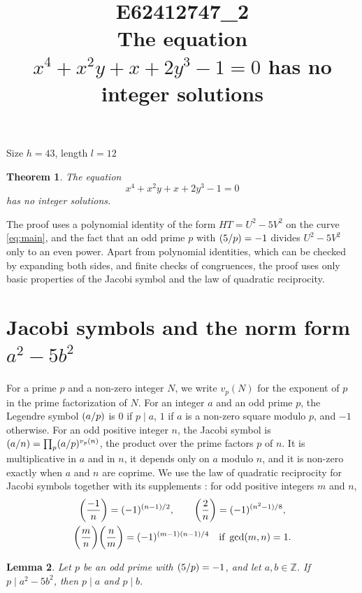 \documentclass[11pt]{article}
\title{\textbf{E62412747\_2}\\[4pt] {\Large The equation $x^{4}+x^{2}y+x+2y^{3}-1=0$ has no integer solutions}}
\author{}
\date{}
\newtheorem{theorem}{Theorem}
\newtheorem{lemma}[theorem]{Lemma}
\newcommand{\Z}{\mathbb{Z}}
\newcommand{\leg}[2]{\mathchoice{\biggl(\dfrac{#1}{#2}\biggr)}{(#1/#2)}{(#1/#2)}{(#1/#2)}}
\begin{document}
\maketitle
\vspace{-8ex}
\begin{center}
Size $h=43$, length $l=12$
\end{center}

\begin{theorem}\label{thm:main}
The equation
\begin{equation}\label{eq:main}
x^{4}+x^{2}y+x+2y^{3}-1=0
\end{equation}
has no integer solutions.
\end{theorem}

The proof uses a polynomial identity of the form $HT=U^2-5V^2$ on the curve \eqref{eq:main}, and the fact that an odd prime $p$ with $\leg{5}{p}=-1$ divides $U^2-5V^2$ only to an even power. Apart from polynomial identities, which can be checked by expanding both sides, and finite checks of congruences, the proof uses only basic properties of the Jacobi symbol and the law of quadratic reciprocity.

\section{\texorpdfstring{Jacobi symbols and the norm form $a^2-5b^2$}{Jacobi symbols and the norm form}}

For a prime $p$ and a non-zero integer $N$, we write $v_p(N)$ for the exponent of $p$ in the prime factorization of $N$. For an integer $a$ and an odd prime $p$, the Legendre symbol $\leg{a}{p}$ is $0$ if $p\mid a$, $1$ if $a$ is a non-zero square modulo $p$, and $-1$ otherwise. For an odd positive integer $n$, the Jacobi symbol is $\leg{a}{n}=\prod_p\leg{a}{p}^{v_p(n)}$, the product over the prime factors $p$ of $n$. It is multiplicative in $a$ and in $n$, it depends only on $a$ modulo $n$, and it is non-zero exactly when $a$ and $n$ are coprime. We use the law of quadratic reciprocity for Jacobi symbols together with its supplements \cite[Chapter~5, \S2]{IR}: for odd positive integers $m$ and $n$,
\begin{gather*}
\leg{-1}{n}=(-1)^{(n-1)/2},\qquad\leg{2}{n}=(-1)^{(n^2-1)/8},\\
\leg{m}{n}\leg{n}{m}=(-1)^{(m-1)(n-1)/4}\quad\text{if }\gcd(m,n)=1.
\end{gather*}

\begin{lemma}\label{lem:divides}
Let $p$ be an odd prime with $\leg{5}{p}=-1$, and let $a,b\in\Z$. If $p\mid a^2-5b^2$, then $p\mid a$ and $p\mid b$.
\end{lemma}
\end{document}
